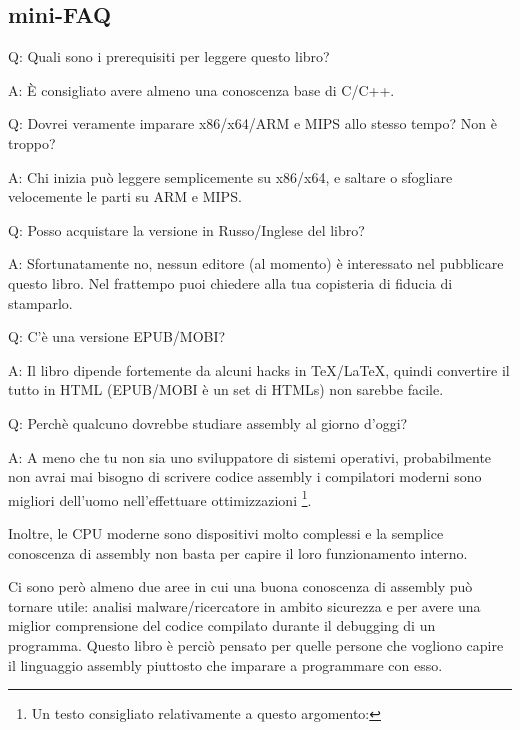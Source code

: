 \subsection*{mini-FAQ}


\par Q: Quali sono i prerequisiti per leggere questo libro?
\par A: È consigliato avere almeno una conoscenza base di C/C++.

\par Q: Dovrei veramente imparare x86/x64/ARM e MIPS allo stesso tempo? Non è troppo?
\par A: Chi inizia può leggere semplicemente su x86/x64, e saltare o sfogliare velocemente le parti su ARM e MIPS.

\par Q: Posso acquistare la versione in Russo/Inglese del libro?
\par A: Sfortunatamente no, nessun editore (al momento) è interessato nel pubblicare questo libro.
Nel frattempo puoi chiedere alla tua copisteria di fiducia di stamparlo.

\par Q: C'è una versione EPUB/MOBI?
\par A: Il libro dipende fortemente da alcuni hacks in TeX/LaTeX, quindi convertire il tutto in HTML (EPUB/MOBI è un set di HTMLs)
non sarebbe facile.

\par Q: Perchè qualcuno dovrebbe studiare assembly al giorno d'oggi?
\par A: A meno che tu non sia uno sviluppatore di \ac{sistemi operativi}, probabilmente non avrai mai bisogno di scrivere codice assembly \textemdash{}i compilatori moderni sono migliori dell'uomo nell'effettuare ottimizzazioni \footnote{Un testo consigliato relativamente a questo argomento: \InSqBrackets{\AgnerFog}}.

Inoltre, le \ac{CPU} moderne sono dispositivi molto complessi e la semplice conoscenza di assembly non basta per capire il loro funzionamento interno.

Ci sono però almeno due aree in cui una buona conoscenza di assembly può tornare utile: analisi malware/ricercatore in ambito sicurezza e per avere una miglior comprensione del codice compilato durante il debugging di un programma.
Questo libro è perciò pensato per quelle persone che vogliono capire il linguaggio assembly piuttosto che imparare a programmare con esso.

